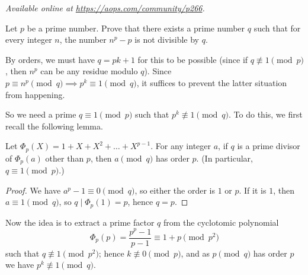 
\textsl{Available online at \url{https://aops.com/community/p266}.}
\begin{mdframed}[style=mdpurplebox,frametitle={Problem statement}]
Let $p$ be a prime number.
Prove that there exists a prime number $q$ such that for every integer $n$,
the number $n^p-p$ is not divisible by $q$.
\end{mdframed}
By orders, we must have $q=pk+1$ for this to be possible
(since if $q \not \equiv 1 \pmod p$, then $n^p$ can be any residue modulo $q$).
Since $p \equiv n^p \pmod q \implies p^k \equiv 1 \pmod q$,
it suffices to prevent the latter situation from happening.

So we need a prime $q \equiv 1 \pmod p$ such that $p^k \not\equiv 1 \pmod q$.
To do this, we first recall the following lemma.
\begin{lemma*}
  Let $\Phi_p(X) = 1 + X + X^2 + \dots + X^{p-1}$.
  For any integer $a$, if $q$ is a prime divisor of $\Phi_p(a)$ other than $p$,
  then $a \pmod q$ has order $p$. (In particular, $q \equiv 1 \pmod p$.)
\end{lemma*}
\begin{proof}
  We have $a^p-1 \equiv 0 \pmod q$, so either the order is $1$ or $p$.
  If it is $1$, then $a \equiv 1 \pmod q$, so $q \mid \Phi_p(1) = p$, hence $q = p$.
\end{proof}

Now the idea is to extract a prime factor $q$
from the cyclotomic polynomial
\[ \Phi_p(p) = \frac{p^p-1}{p-1} \equiv 1+p \pmod{p^2} \]
such that $q \not\equiv 1 \pmod{p^2}$;
hence $k \not\equiv 0 \pmod p$,
and as $p \pmod q$ has order $p$ we have $p^k \not\equiv 1 \pmod q$.
\pagebreak



